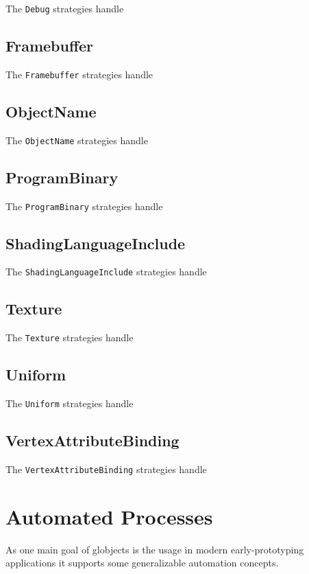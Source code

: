 \documentclass{article}
\begin{document}
The \verb|Debug| strategies handle

\subsection{Framebuffer}

The \verb|Framebuffer| strategies handle

\subsection{ObjectName}

The \verb|ObjectName| strategies handle

\subsection{ProgramBinary}

The \verb|ProgramBinary| strategies handle

\subsection{ShadingLanguageInclude}

The \verb|ShadingLanguageInclude| strategies handle

\subsection{Texture}

The \verb|Texture| strategies handle

\subsection{Uniform}

The \verb|Uniform| strategies handle

\subsection{VertexAttributeBinding}

The \verb|VertexAttributeBinding| strategies handle

\section{Automated Processes}

As one main goal of globjects is the usage in modern early-prototyping applications it supports some generalizable automation concepts.
\end{document}
